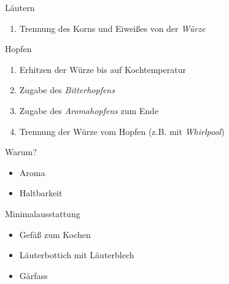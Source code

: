 \documentclass[9pt, ngerman]{beamer}
\begin{document}
\begin{frame}{Läutern}
  \begin{enumerate}
    \item Trennung des Korns und Eiweißes von der \emph{Würze}
  \end{enumerate}
\end{frame}
\begin{frame}{Hopfen}
  \begin{enumerate}
    \item Erhitzen der Würze bis auf Kochtemperatur
    \item Zugabe des \emph{Bitterhopfens}
    \item Zugabe des \emph{Aromahopfens} zum Ende
    \item Trennung der Würze vom Hopfen (z.B. mit \emph{Whirlpool})
  \end{enumerate}
  \begin{block}{Warum?}
    \begin{itemize}
      \item Aroma
      \item Haltbarkeit
    \end{itemize}
  \end{block}
\end{frame}
\begin{frame}{Minimalausstattung}
  \begin{itemize}
    \item Gefäß zum Kochen
    \item Läuterbottich mit Läuterblech
    \item Gärfass
  \end{itemize}
\end{frame}

\end{document}
